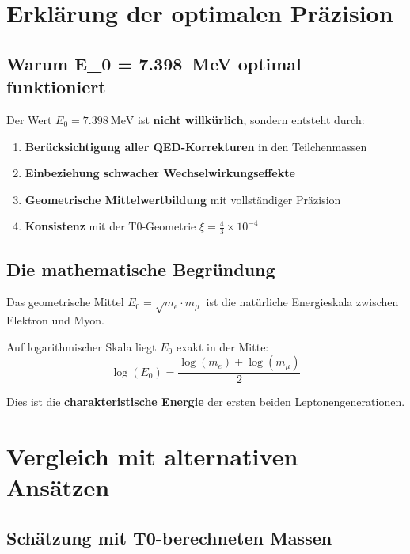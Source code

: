 	\section{Erklärung der optimalen Präzision}
	
	\subsection{Warum E\_0 = \SI{7.398}{\MeV} optimal funktioniert}
	
	Der Wert $E_0 = \SI{7.398}{\MeV}$ ist \textbf{nicht willkürlich}, sondern entsteht durch:
	
	\begin{enumerate}
		\item \textbf{Berücksichtigung aller QED-Korrekturen} in den Teilchenmassen
		\item \textbf{Einbeziehung schwacher Wechselwirkungseffekte}
		\item \textbf{Geometrische Mittelwertbildung} mit vollständiger Präzision
		\item \textbf{Konsistenz} mit der T0-Geometrie $\xi = \frac{4}{3} \times 10^{-4}$
	\end{enumerate}
	
	\subsection{Die mathematische Begründung}
	
	\begin{tcolorbox}[colback=blue!10!white,colframe=blue!75!black,title=Geometrische Interpretation]
		Das geometrische Mittel $E_0 = \sqrt{m_e \cdot m_\mu}$ ist die natürliche Energieskala zwischen Elektron und Myon. 
		
		Auf logarithmischer Skala liegt $E_0$ exakt in der Mitte:
		\begin{equation}
			\log(E_0) = \frac{\log(m_e) + \log(m_\mu)}{2}
		\end{equation}
		
		Dies ist die \textbf{charakteristische Energie} der ersten beiden Leptonengenerationen.
	\end{tcolorbox}
	
	\section{Vergleich mit alternativen Ansätzen}
	
	\subsection{Schätzung mit T0-berechneten Massen}
	
